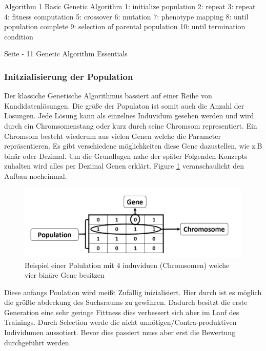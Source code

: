 Algorithm 1 Basic Genetic Algorithm
1: initialize population
2: repeat
3: 		repeat
4:			fitness computation
5:			crossover
6:			mutation
7:			phenotype mapping
8:		until population complete
9:		selection of parental population
10: until termination condition

Seite - 11 Genetic Algorithm Essentials
\fi 

\subsubsection{Initzialisierung der Population}
Der klassiche Genetische Algorithmus bassiert auf einer Reihe von Kandidatenlösungen. Die größe der Populaton ist somit auch die Anzahl der Lösungen. Jede Lösung kann als einzelnes Induvidum gesehen werden und wird durch ein Chromsomenstang oder kurz durch seine Chromsom representiert. Ein Chromsom besteht wiederum aus vielen Genen welche die Parameter repräsentieren. Es gibt verschiedene möglichkeiten diese Gene dazustellen, wie z.B binär oder Dezimal. Um die Grundlagen nahe der später Folgenden Konzepts zuhalten wird alles per Dezimal Genen erklärt.
Figure \ref{fig:chromosome} veranschaulicht den Aufbau nocheinmal.

\noindent%
\begin{figure}[H]
  \centering  
  \includegraphics[scale=0.3]{img/Chromsome-s134-PracticalComputerVion.png}
  \caption{Beispiel einer Polulation mit 4 induviduen (Chromsomen) welche vier binäre Gene besitzen \cite{Rashid2017} }
  \label{fig:chromosome}
\end{figure}

Diese anfangs Poulation wird meißt Zufällig inizialisiert. Hier durch ist es möglich die größte abdeckung des Suchsraums zu gewähren. Dadurch besitzt die erste Generation eine sehr geringe Fittness dies verbessert sich aber im Lauf des Trainings. Durch Selection werde die nicht unnötigen/Contra-produktiven Individumen aussotiert. Bevor dies passiert muss aber erst die Bewertung durchgeführt werden.


